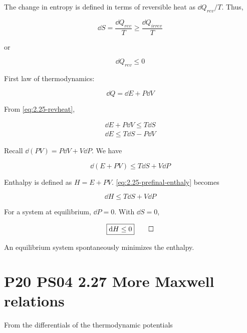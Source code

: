 \documentclass[9pt,a4paper,twocolumn]{article}
\begin{document}
\begin{enumerate}[(a)]
The change in entropy is defined in terms of reversible heat as $\dd{Q_{rev}}/T$. Thus,

\begin{equation}
	\dd{S} = \frac{\dd{Q_{rev}}}{T} \geq \frac{\dd{Q_{irrev}}}{T}
\end{equation}

or

\begin{equation}
	\dd{Q_{rev}} \leq 0 \label{eq:2.25-revheat}
\end{equation}

First law of thermodynamics:

\begin{equation}
	\dd{Q} = \dd{E} + P\dd{V}
\end{equation}

From \eqref{eq:2.25-revheat},

\begin{eqnarray}
	\dd{E} + P\dd{V} \leq T\dd{S} \\
	\dd{E} \leq T\dd{S} - P\dd{V}
\end{eqnarray}

Recall $\dd(PV) = P\dd{V} + V\dd{P}$. We have

\begin{equation}
	\dd(E+PV) \leq T\dd{S} + V\dd{P} \label{eq:2.25-prefinal-enthaly}
\end{equation}

Enthalpy is defined as $H = E + PV$. \eqref{eq:2.25-prefinal-enthaly} becomes

\begin{equation}
	\dd{H} \leq T\dd{S} + V\dd{P}
\end{equation}

For a system at equilibrium, $\dd{P} = 0$. With $\dd{S} = 0$,

\begin{equation}
	\boxed{
		\dd{H} \leq 0
	} \label{eq:2.25-answer-b} \qed
\end{equation}

An equilibrium system spontaneously minimizes the enthalpy.

\end{enumerate}

\section{P20 PS04 2.27 More Maxwell relations}

From the differentials of the thermodynamic potentials
\end{document}
